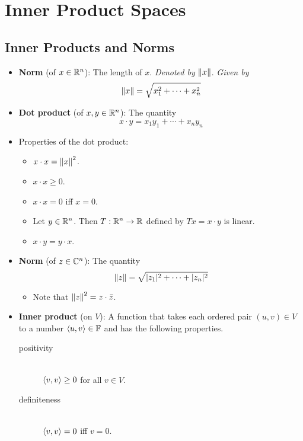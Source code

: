 \documentclass[../main.tex]{subfiles}
\begin{document}
\chapter{Inner Product Spaces}
\section{Inner Products and Norms}
\begin{itemize}
    \item {}\textbf{Norm} (of $x\in\mathbb{R}^n$): The length of $x$. \emph{Denoted by} $\norm{x}$. \emph{Given by}
    \begin{equation*}
        \norm{x} = \sqrt{x_1^2+\cdots+x_n^2}
    \end{equation*}
    \item \textbf{Dot product} (of $x,y\in\mathbb{R}^n$): The quantity
    \begin{equation*}
        x\cdot y = x_1y_1+\cdots+x_ny_n
    \end{equation*}
    \item Properties of the dot product:
    \begin{itemize}
        \item $x\cdot x=\norm{x}^2$.
        \item $x\cdot x\geq 0$.
        \item $x\cdot x=0$ iff $x=0$.
        \item Let $y\in\mathbb{R}^n$. Then $T:\mathbb{R}^n\to\mathbb{R}$ defined by $Tx=x\cdot y$ is linear.
        \item $x\cdot y=y\cdot x$.
    \end{itemize}
    \item \textbf{Norm} (of $z\in\mathbb{C}^n$): The quantity
    \begin{equation*}
        \norm{z} = \sqrt{|z_1|^2+\cdots+|z_n|^2}
    \end{equation*}
    \begin{itemize}
        \item Note that $\norm{z}^2=z\cdot\bar{z}$.
    \end{itemize}
    \item \textbf{Inner product} (on $V$): A function that takes each ordered pair $(u,v)\in V$ to a number $\left\langle{u},{v}\right\rangle\in\mathbb{F}$ and has the following properties.
    \begin{description}
        \item[positivity] \hfill\\ $\left\langle{v},{v}\right\rangle\geq 0$ for all $v\in V$.
        \item[definiteness] \hfill\\ $\left\langle{v},{v}\right\rangle=0$ iff $v=0$.

\end{description}
\end{itemize}
\end{document}
